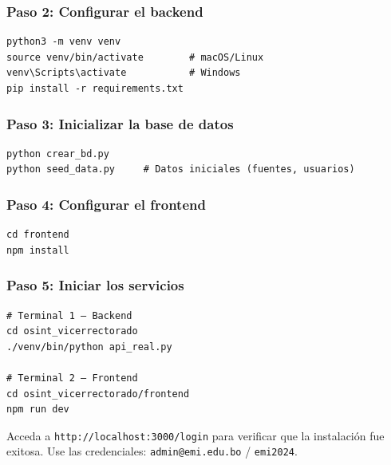\documentclass[12pt,a4paper]{article}
\begin{document}
\subsubsection{Paso 2: Configurar el backend}
\begin{verbatim}
python3 -m venv venv
source venv/bin/activate        # macOS/Linux
venv\Scripts\activate           # Windows
pip install -r requirements.txt
\end{verbatim}

\subsubsection{Paso 3: Inicializar la base de datos}
\begin{verbatim}
python crear_bd.py
python seed_data.py     # Datos iniciales (fuentes, usuarios)
\end{verbatim}

\subsubsection{Paso 4: Configurar el frontend}
\begin{verbatim}
cd frontend
npm install
\end{verbatim}

\subsubsection{Paso 5: Iniciar los servicios}
\begin{verbatim}
# Terminal 1 — Backend
cd osint_vicerrectorado
./venv/bin/python api_real.py

# Terminal 2 — Frontend
cd osint_vicerrectorado/frontend
npm run dev
\end{verbatim}

\begin{infobox}
Acceda a \texttt{http://localhost:3000/login} para verificar que la instalación fue exitosa. Use las credenciales: \texttt{admin@emi.edu.bo} / \texttt{emi2024}.
\end{infobox}
\end{document}
